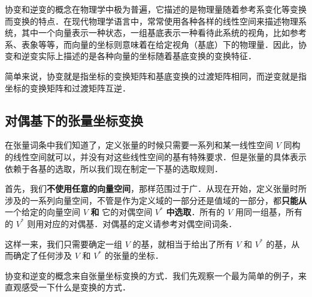 

协变和逆变的概念在物理学中极为普遍，它描述的是物理量随着参考系变化等变换而变换的特点．在现代物理学语言中，常常使用各种各样的线性空间来描述物理系统，其中一个向量表示一种状态，一组基底表示一种看待此系统的视角，比如参考系、表象等等，而向量的坐标则意味着在给定视角（基底）下的物理量．因此，协变和逆变实际上描述的是各种向量的坐标随着基底变换的变换特征．

简单来说，协变就是指坐标的变换矩阵和基底变换的过渡矩阵相同，而逆变就是指坐标的变换矩阵和过渡矩阵互逆．

\subsection{对偶基下的张量坐标变换}

在张量词条中我们知道了，定义张量的时候只需要一系列和某一线性空间 $V$ 同构的线性空间就可以，并没有对这些线性空间的基有特殊要求．但是张量的具体表示依赖于各基的选取，所以我们现在制定一下基的选取规则．

首先，我们\textbf{不使用任意的向量空间}，那样范围过于广．从现在开始，定义张量时所涉及的一系列向量空间，不管是作为定义域的一部分还是值域的一部分，都\textbf{只能从}一个给定的向量空间 $V$ \textbf{和} 它的对偶空间 $V^*$ \textbf{中选取}．所有的 $V$ 用同一组基，所有的 $V^*$ 则用对应的对偶基．对偶基的定义请参考对偶空间词条．

这样一来，我们只需要确定一组 $V$ 的基，就相当于给出了所有 $V$ 和 $V^*$ 的基，从而确定了任何涉及 $V$ 和 $V^*$ 的张量的坐标．



协变和逆变的概念来自张量坐标变换的方式．我们先观察一个最为简单的例子，来直观感受一下什么是变换的方式．


